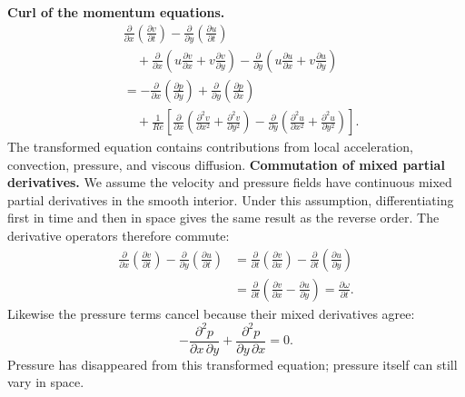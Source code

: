 \textbf{Curl of the momentum equations.}
\begin{align*}
&\frac{\partial}{\partial x}\left(\frac{\partial v}{\partial t}\right)
-\frac{\partial}{\partial y}\left(\frac{\partial u}{\partial t}\right)\\
&\quad+\frac{\partial}{\partial x}\left(u\frac{\partial v}{\partial x}+v\frac{\partial v}{\partial y}\right)
-\frac{\partial}{\partial y}\left(u\frac{\partial u}{\partial x}+v\frac{\partial u}{\partial y}\right)\\
&=-\frac{\partial}{\partial x}\left(\frac{\partial p}{\partial y}\right)
+\frac{\partial}{\partial y}\left(\frac{\partial p}{\partial x}\right)\\
&\quad+\frac{1}{Re}\left[
\frac{\partial}{\partial x}\left(\frac{\partial^2v}{\partial x^2}+\frac{\partial^2v}{\partial y^2}\right)
-\frac{\partial}{\partial y}\left(\frac{\partial^2u}{\partial x^2}+\frac{\partial^2u}{\partial y^2}\right)\right].
\end{align*}
The transformed equation contains contributions from local acceleration, convection, pressure, and viscous diffusion.
\newpage
{}
\textbf{Commutation of mixed partial derivatives.} We assume the velocity and pressure fields have continuous mixed partial derivatives in the smooth interior. Under this assumption, differentiating first in time and then in space gives the same result as the reverse order. The derivative operators therefore commute:
\begin{align*}
\frac{\partial}{\partial x}\left(\frac{\partial v}{\partial t}\right)
-\frac{\partial}{\partial y}\left(\frac{\partial u}{\partial t}\right)
&=\frac{\partial}{\partial t}\left(\frac{\partial v}{\partial x}\right)
-\frac{\partial}{\partial t}\left(\frac{\partial u}{\partial y}\right)\\
&=\frac{\partial}{\partial t}\left(\frac{\partial v}{\partial x}-\frac{\partial u}{\partial y}\right)
=\frac{\partial\omega}{\partial t}.
\end{align*}
Likewise the pressure terms cancel because their mixed derivatives agree:
\[
-\frac{\partial^2p}{\partial x\,\partial y}
+\frac{\partial^2p}{\partial y\,\partial x}=0.
\]
Pressure has disappeared from this transformed equation; pressure itself can still vary in space.

